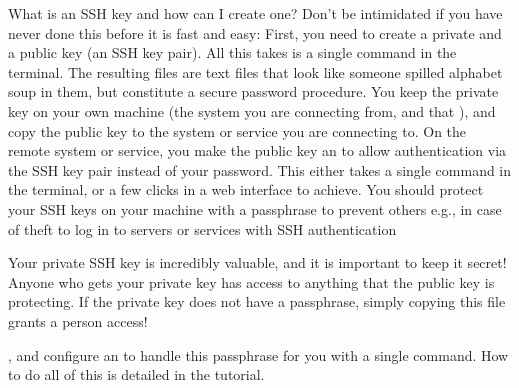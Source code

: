 \begin{findoutmore}[label={fom-sshkey}, before title={\thetcbcounter\ }, check odd page=true]{What is an SSH key and how can I create one?}
\sphinxAtStartPar
Don’t be intimidated if you have never done this before \textendash{} it is fast and easy:
First, you need to create a private and a public key (an SSH key pair).
All this takes is a single command in the terminal. The resulting files are
text files that look like someone spilled alphabet soup in them, but constitute
a secure password procedure.
You keep the private key on your own machine (the system you are connecting from,
and that ),
and copy the public key to the system or service you are connecting to.
On the remote system or service, you make the public key an  to
allow authentication via the SSH key pair instead of your password. This
either takes a single command in the terminal, or a few clicks in a web interface
to achieve.
You should protect your SSH keys on your machine with a passphrase to prevent
others \textendash{} e.g., in case of theft \textendash{} to log in to servers or services with
SSH authentication%
\begin{footnote}\sphinxAtStartFootnote
Your private SSH key is incredibly valuable, and it is important to keep
it secret!
Anyone who gets your private key has access to anything that the public key
is protecting. If the private key does not have a passphrase, simply copying
this file grants a person access!
%
\end{footnote}, and configure an 
to handle this passphrase for you with a single command. How to do all of this
is detailed in the tutorial.


\end{findoutmore}
